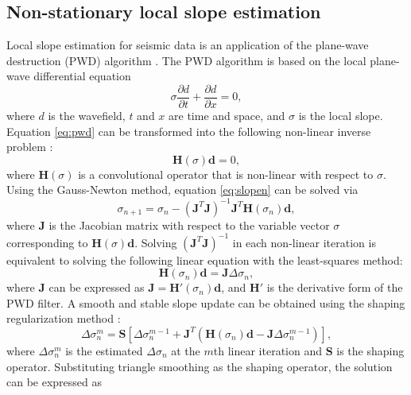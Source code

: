 \subsection{Non-stationary local slope estimation}
Local slope estimation for seismic data is an application of the plane-wave destruction (PWD) algorithm \cite[]{fomel2002}. 
The PWD algorithm is based on the local plane-wave differential equation
\begin{equation}
\sigma\frac{\partial d}{\partial t}+\frac{\partial d}{\partial x}=0,
\label{eq:pwd}
\end{equation}
where $d$ is the wavefield, $t$ and $x$ are time and space, and $\sigma$ is the local slope. 
Equation \ref{eq:pwd} can be transformed into the following non-linear inverse problem \cite[]{wang2021}: 
\begin{equation}
\mathbf{H}(\sigma)\mathbf{d}=0,
\label{eq:slopen}
\end{equation}
where $\mathbf{H}(\sigma)$ is a convolutional operator that is non-linear with respect to $\sigma$. 
Using the Gauss-Newton method, equation \ref{eq:slopen} can be solved via 
\begin{equation}
\sigma_{n+1} = \sigma_{n} - (\mathbf{J}^{T}\mathbf{J})^{-1}\mathbf{J}^{T}\mathbf{H}(\sigma_{n})\mathbf{d},
\label{eq:slopegn}
\end{equation}
where $\mathbf{J}$ is the Jacobian matrix with respect to the variable vector $\sigma$ corresponding to $\mathbf{H}(\sigma)\mathbf{d}$.
Solving $(\mathbf{J}^{T}\mathbf{J})^{-1}$ in each non-linear iteration is equivalent to solving the following linear equation with the least-squares method: 
\begin{equation}
\mathbf{H}(\sigma_n)\mathbf{d}=\mathbf{J}\Delta\sigma_n,
\label{eq:slopegn2}
\end{equation}
where $\mathbf{J}$ can be expressed as $\mathbf{J}=\mathbf{H}'(\sigma_n)\mathbf{d}$, and $\mathbf{H}'$ is the derivative form of the PWD filter. A smooth and stable slope update can be obtained using the shaping regularization method \cite[]{fomel2007b}:
\begin{equation}
\Delta\sigma_{n}^{m}=\mathbf{S}[\Delta\sigma_{n}^{m-1}+\mathbf{J}^T(\mathbf{H}(\sigma_{n})\mathbf{d}-\mathbf{J}\Delta\sigma_{n}^{m-1})],
\label{eq:slopeshap}
\end{equation}
where $\Delta\sigma_n^m$ is the estimated $\Delta\sigma_n$ at the $m$th linear iteration and $\mathbf{S}$ is the shaping operator. Substituting triangle smoothing as the shaping operator, the solution can be expressed as  
